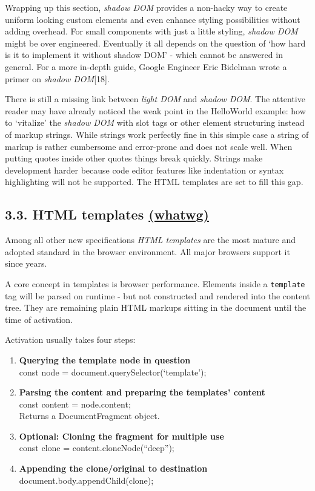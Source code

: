 \documentclass[]{article}
\providecommand{\tightlist}{%
  \setlength{\itemsep}{0pt}\setlength{\parskip}{0pt}}
\begin{document}
Wrapping up this section, \emph{shadow DOM} provides a non-hacky way to
create uniform looking custom elements and even enhance styling
possibilities without adding overhead. For small components with just a
little styling, \emph{shadow DOM} might be over engineered. Eventually
it all depends on the question of `how hard is it to implement it
without shadow DOM' - which cannot be answered in general. For a more
in-depth guide, Google Engineer Eric Bidelman wrote a primer on
\emph{shadow DOM}{[}18{]}.

There is still a missing link between \emph{light DOM} and \emph{shadow
DOM}. The attentive reader may have already noticed the weak point in
the HelloWorld example: how to `vitalize' the \emph{shadow DOM} with
slot tags or other element structuring instead of markup strings. While
strings work perfectly fine in this simple case a string of markup is
rather cumbersome and error-prone and does not scale well. When putting
quotes inside other quotes things break quickly. Strings make
development harder because code editor features like indentation or
syntax highlighting will not be supported. The HTML templates are set to
fill this gap.

\subsection{\texorpdfstring{3.3. HTML templates
\href{https://html.spec.whatwg.org/multipage/scripting.html\#the-template-element}{(whatwg)}}{3.3. HTML templates (whatwg)}}\label{html-templates-whatwg}

Among all other new specifications \emph{HTML templates} are the most
mature and adopted standard in the browser environment. All major
browsers support it since years.

A core concept in templates is browser performance. Elements inside a
\texttt{template} tag will be parsed on runtime - but not constructed
and rendered into the content tree. They are remaining plain HTML
markups sitting in the document until the time of activation.

Activation usually takes four steps:

\begin{enumerate}
\def\labelenumi{\arabic{enumi}.}
\tightlist
\item
  \textbf{Querying the template node in question}\\
  const node = document.querySelector(`template');
\item
  \textbf{Parsing the content and preparing the templates' content}\\
  const content = node.content;\\
  Returns a DocumentFragment object.
\item
  \textbf{Optional: Cloning the fragment for multiple use}\\
  const clone = content.cloneNode(``deep'');
\item
  \textbf{Appending the clone/original to destination}\\
  document.body.appendChild(clone);
\end{enumerate}
\end{document}
